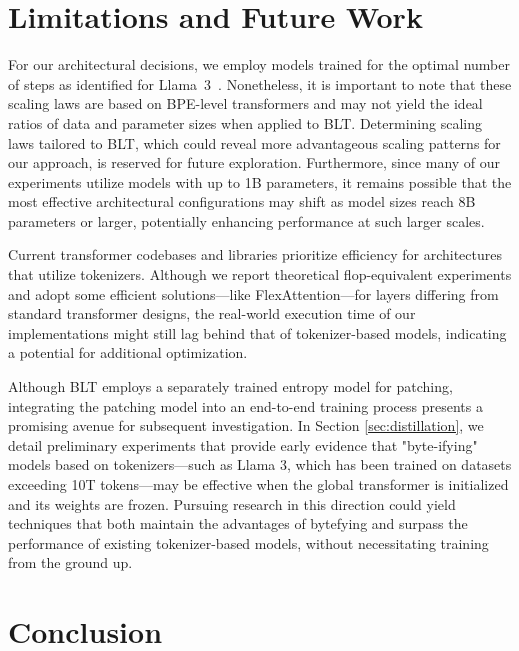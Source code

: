 \section{Limitations and Future Work}

For our architectural decisions, we employ models trained for the optimal number of steps as identified for Llama~3~\citep{dubey2024llama}. Nonetheless, it is important to note that these scaling laws are based on BPE-level transformers and may not yield the ideal ratios of data and parameter sizes when applied to {\textsc BLT}. Determining scaling laws tailored to {\textsc BLT}, which could reveal more advantageous scaling patterns for our approach, is reserved for future exploration. Furthermore, since many of our experiments utilize models with up to 1B parameters, it remains possible that the most effective architectural configurations may shift as model sizes reach 8B parameters or larger, potentially enhancing performance at such larger scales.

Current transformer codebases and libraries prioritize efficiency for architectures that utilize tokenizers. Although we report theoretical flop-equivalent experiments and adopt some efficient solutions—like FlexAttention—for layers differing from standard transformer designs, the real-world execution time of our implementations might still lag behind that of tokenizer-based models, indicating a potential for additional optimization.

Although {\textsc BLT} employs a separately trained entropy model for patching, integrating the patching model into an end-to-end training process presents a promising avenue for subsequent investigation. In Section \ref{sec:distillation}, we detail preliminary experiments that provide early evidence that "byte-ifying" models based on tokenizers—such as Llama 3, which has been trained on datasets exceeding 10T tokens—may be effective when the global transformer is initialized and its weights are frozen. Pursuing research in this direction could yield techniques that both maintain the advantages of bytefying and surpass the performance of existing tokenizer-based models, without necessitating training from the ground up.

\section{Conclusion}
\label{section:conclusion}

